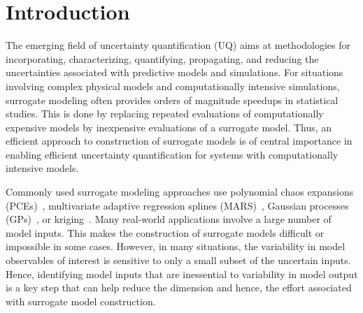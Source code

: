 \section{Introduction}
\label{sec:intro}


The emerging field of uncertainty quantification (UQ) aims at methodologies for
incorporating, characterizing, quantifying, propagating, and reducing the
uncertainties associated with predictive models and simulations.  For
situations involving complex physical models and computationally intensive
simulations, surrogate modeling often provides orders of magnitude speedups in
statistical studies. This is done by replacing repeated evaluations of
computationally expensive models by inexpensive evaluations of a surrogate
model.  Thus, an efficient approach to construction of surrogate models is of
central importance in enabling efficient uncertainty quantification for
systems with computationally intensive models. 


Commonly used surrogate modeling approaches use polynomial chaos expansions
(PCEs)~\cite{Xiu:2002,Ghanem:2003,Olivier:2010}, multivariate adaptive
regression splines (MARS)~\cite{friedman93}, Gaussian processes
(GPs)~\cite{Rasmussen:2004}, or kriging~\cite{Stein:2012}.  Many real-world
applications involve a large number of model inputs. This makes
the construction of surrogate models difficult or impossible in some cases.
However, in many situations, the variability in model observables of interest
is sensitive to only a small subset of the uncertain inputs.  Hence,
identifying model inputs that are inessential to variability in model output is
a key step that can help reduce the dimension and hence, the effort
associated with surrogate model construction. 


